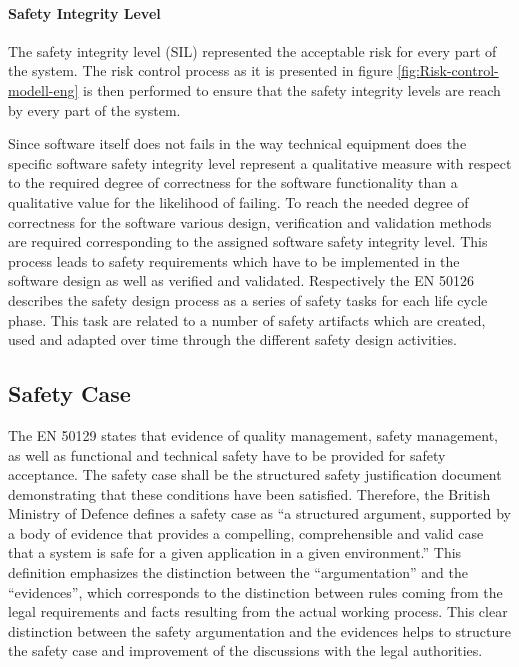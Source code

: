 \documentclass{template/openetcs_report}
\begin{document}
\paragraph{Safety Integrity Level}

The safety integrity level (SIL) represented the acceptable risk for every part of the system. The risk control process as it is presented in figure \ref{fig:Risk-control-modell-eng} is then performed to ensure that the safety integrity levels are reach by every part of the system.

Since software itself does not fails in the way technical equipment does the specific software safety integrity level represent a qualitative measure with respect to the required degree of correctness for the software functionality than a qualitative value for the likelihood of failing. To reach the needed degree of correctness for the software various design, verification and validation methods are required corresponding to the assigned software safety integrity level. This process leads to safety requirements which have to be implemented in the software design as well as verified and validated. Respectively the EN 50126 describes the safety design process as a series of safety tasks for each life cycle phase. This task are related to a number of safety artifacts which are created, used and adapted over time through the different safety design activities.


\subsection{Safety Case}

The EN 50129 states that evidence of quality management, safety management, as well as functional and technical safety have to be provided for safety acceptance. The safety case shall be the structured safety justification document demonstrating that these conditions have been satisfied.
Therefore, the British Ministry of Defence defines a safety case as “a structured argument, supported by a body of evidence that provides a compelling, comprehensible and valid case that a system is safe for a given application in a given environment.”\cite{MinistryofDefence.2007} This definition emphasizes the distinction between the “argumentation” and the “evidences”, which corresponds to the distinction between rules coming from the legal requirements and facts resulting from the actual working process. This clear distinction between the safety argumentation and the evidences helps to structure the safety case and improvement of the discussions with the legal authorities.\cite{Muller.2010}
\end{document}
